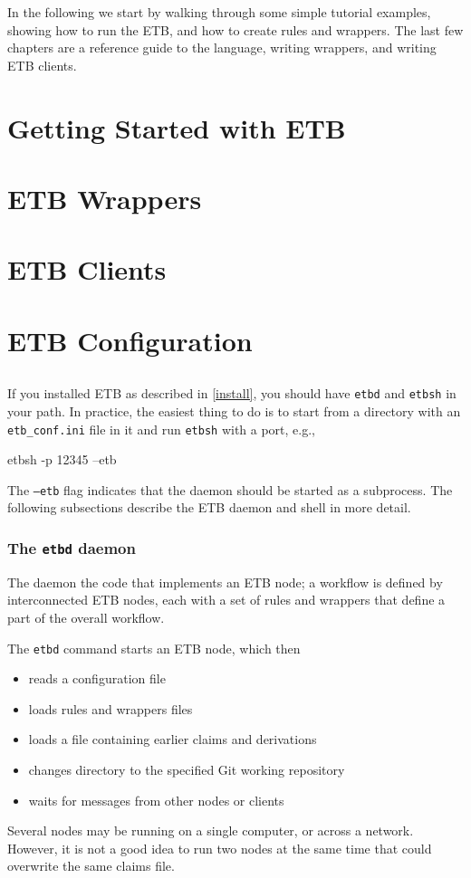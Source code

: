 \documentclass{report}
\begin{document}
In the following we start by walking through some simple tutorial
examples, showing how to run the ETB, and how to create rules and
wrappers.  The last few chapters are a reference guide to the
language, writing wrappers, and writing ETB clients.

%
\chapter{Getting Started with ETB}


%
%
%
\chapter{ETB Wrappers}

%
\chapter{ETB Clients}

\chapter{ETB Configuration}


\section{}
If you installed ETB as described in \ref{install}, you should have
\texttt{etbd} and \texttt{etbsh} in your path.  In practice, the easiest
thing to do is to start from a directory with an \texttt{etb\_conf.ini}
file in it and run \texttt{etbsh} with a port, e.g.,
\begin{bashcode}
etbsh -p 12345 --etb
\end{bashcode}
The \texttt{--etb} flag indicates that the daemon should be started as a
subprocess.
The following subsections describe the ETB daemon and shell in more detail. 

\subsection{The \texttt{etbd} daemon}
The daemon the code that implements an ETB node; a workflow is defined by
interconnected ETB nodes, each with a set of rules and wrappers that
define a part of the overall workflow.

The \texttt{etbd} command starts an ETB node, which then
\begin{itemize}
\item reads a configuration file
\item loads rules and wrappers files
\item loads a file containing earlier claims and derivations
\item changes directory to the specified Git working repository
\item waits for messages from other nodes or clients
\end{itemize}
Several nodes may be running on a single computer, or across a network.
However, it is not a good idea to run two nodes at the same time that
could overwrite the same claims file.
\end{document}
